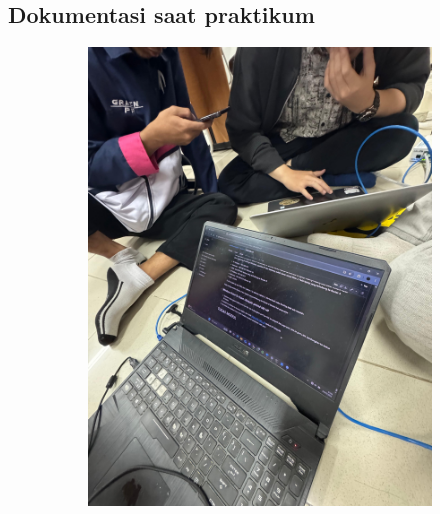 \subsection{Dokumentasi saat praktikum}
\begin{figure}[H]
	\centering
	\begin{subfigure}[b]{0.4\linewidth}
		\centering
		\includegraphics[width=\linewidth]{P3/img/dokum.jpg}
	\end{subfigure}
	\begin{subfigure}[b]{0.4\linewidth}
		\centering

\end{subfigure}
\end{figure}

